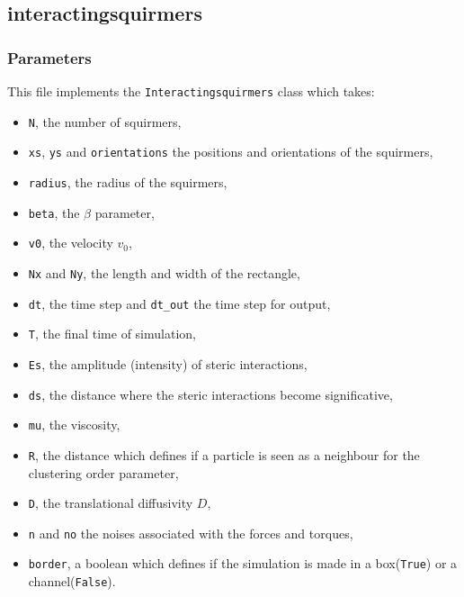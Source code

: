 \documentclass{article}
\begin{document}
\subsection*{interactingsquirmers}
\subsubsection*{Parameters}
This file implements the \texttt{Interactingsquirmers} class which takes:
\begin{itemize}
   \item \texttt{N}, the number of squirmers,
   \item \texttt{xs}, \texttt{ys} and \texttt{orientations} the positions and orientations of the squirmers,
   \item \texttt{radius}, the radius of the squirmers,
   \item \texttt{beta}, the $\beta$ parameter,
   \item \texttt{v0}, the velocity $v_0$,
   \item \texttt{Nx} and \texttt{Ny}, the length and width of the rectangle,
   \item \texttt{dt}, the time step and \texttt{dt\_out} the time step for output,
   \item \texttt{T}, the final time of simulation,
   \item \texttt{Es}, the amplitude (intensity) of steric interactions,
   \item \texttt{ds}, the distance where the steric interactions become significative,
   \item \texttt{mu}, the viscosity,
   \item \texttt{R}, the distance which defines if a particle is seen as a neighbour for the clustering order parameter,
   \item \texttt{D}, the translational diffusivity $D$,
   \item \texttt{n} and \texttt{no} the noises associated with the forces and torques,
   \item \texttt{border}, a boolean which defines if the simulation is made in a box(\texttt{True}) or a channel(\texttt{False}).
\end{itemize}
\end{document}
